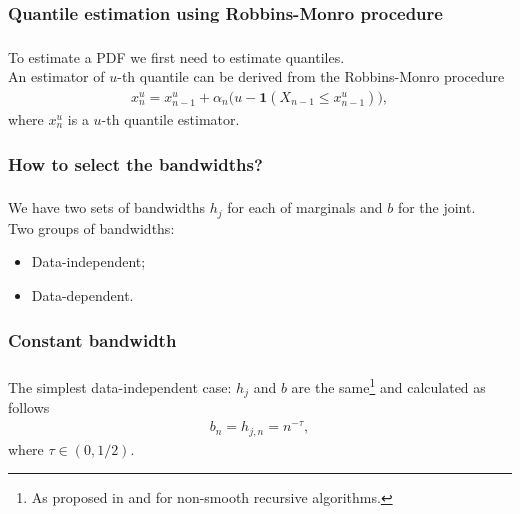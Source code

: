 \documentclass[aspectratio=169]{beamer}
\begin{document}
		\subsubsection{Quantile estimation using Robbins-Monro procedure}
			\begin{frame}
				\frametitle{\insertsubsubsection}
				
				To estimate a PDF we first need to estimate quantiles.
				\\[1em]
				
				
				\onslide<2-> An estimator of $ u $-th quantile can be derived from the Robbins-Monro procedure
				\begin{align}
				x^u_n = x^u_{n-1} + \alpha_n\big(u - \mathbf{1}(X_{n-1}\leq x^u_{n-1})\big),
				\end{align}
				where $ x^u_n $ is a $ u $-th quantile estimator.
				
			\end{frame}
			
		\subsubsection{How to select the bandwidths?}\label{bandwidth}
			\begin{frame}
				\frametitle{\insertsubsubsection}
				
				We have two sets of bandwidths $ h_j $ for each of marginals and $ b $ for the joint. \\[1em]
				
				\onslide<2-> Two groups of bandwidths:
				\begin{itemize}
					\item Data-independent;
					\item Data-dependent.
				\end{itemize}
				
			\end{frame}
		
		\subsubsection{Constant bandwidth}
			\begin{frame}
				\frametitle{\insertsubsubsection}
				
				The simplest data-independent case: $ h_j $ and $ b $ are the same\footnote{As proposed in \textcite{Robinson1975} and \textcite{Holst1987} for non-smooth recursive algorithms.} and calculated as follows
				\begin{align}
				b_n = h_{j,n} = n^{-\tau},
				\end{align}
				where $ \tau \in (0, 1/2) $.
				
			\end{frame}	
		
\end{document}
